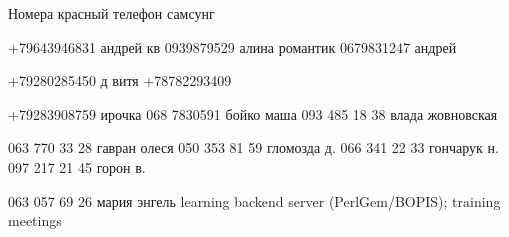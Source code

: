  



Номера красный телефон самсунг

+79643946831 андрей кв
0939879529 алина романтик
0679831247 андрей

+79280285450 д витя
+78782293409

+79283908759 ирочка
068 7830591 бойко маша
093 485 18 38 влада жовновская 

063 770 33 28 гавран олеся
050 353 81 59 гломозда д.
066 341 22 33 гончарук н.
097 217 21 45 горон в.

063 057 69 26 мария энгель
learning backend server (PerlGem/BOPIS); training meetings


 
